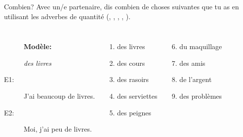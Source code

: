 \begin{frame}{Combien? }
  Avec un/e partenaire, dis combien de choses suivantes que tu as en utilisant les adverbes de quantité (, , , , ). \\
  \begin{columns}[t]
      \begin{description}
        \item[] \textbf{Modèle:}
        \item[] \emph{des livres}
        \item[E1:] J'ai beaucoup de livres.
        \item[E2:] Moi, j'ai peu de livres.
      \end{description}
      \begin{enumerate}
        \item des livres
        \item des cours
        \item des rasoirs
        \item des serviettes
        \item des peignes
      \end{enumerate}
      \begin{enumerate}
        \setcounter{enumi}{5}
        \item du maquillage
        \item des amis
        \item de l'argent
        \item des problèmes
      \end{enumerate}
  \end{columns}
\end{frame}